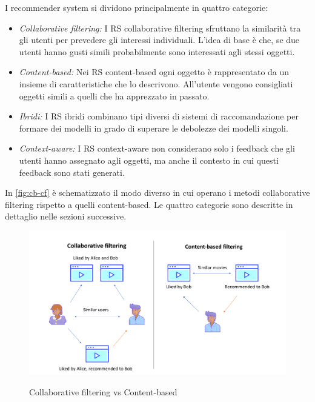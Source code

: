 \documentclass[12pt,italian]{report}
\begin{document}
\vspace{5mm}
\noindent I recommender system si dividono principalmente in quattro categorie:
\begin{itemize}
	\item \textit{Collaborative filtering:} I RS collaborative filtering sfruttano la similarità tra gli utenti per prevedere gli interessi individuali. L'idea di base è che, se due utenti hanno gusti simili probabilmente sono interessati agli stessi oggetti.
	\item \textit{Content-based:} Nei RS content-based ogni oggetto è rappresentato da un insieme di caratteristiche che lo descrivono. All'utente vengono consigliati oggetti simili a quelli che ha apprezzato in passato.
	\item \textit{Ibridi:} I RS ibridi combinano tipi diversi di sistemi di raccomandazione per formare dei modelli in grado di superare le debolezze dei modelli singoli.
	\item \textit{Context-aware:} I RS context-aware non considerano solo i feedback che gli utenti hanno assegnato agli oggetti, ma anche il contesto in cui questi feedback sono stati generati.
\end{itemize}

\noindent In \autoref{fig:cb-cf} è schematizzato il modo diverso in cui operano i metodi collaborative filtering rispetto a quelli content-based. Le quattro categorie sono descritte in dettaglio nelle sezioni successive.

\begin{figure}
  \centering
  \includegraphics[width=\linewidth]{immagini/cb_cf_schema.png}
  \caption{Collaborative filtering vs Content-based}
  \cite{cf-cb-picture}
  \label{fig:cb-cf}
  
\end{figure}
\end{document}

